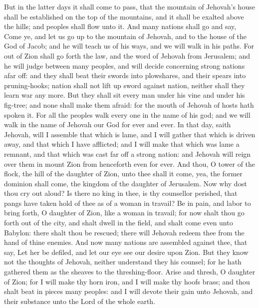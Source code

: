 But in the latter days it shall come to pass, that the mountain of Jehovah’s house shall be established on the top of the mountains, and it shall be exalted above the hills; and peoples shall flow unto it. And many nations shall go and say, Come ye, and let us go up to the mountain of Jehovah, and to the house of the God of Jacob; and he will teach us of his ways, and we will walk in his paths. For out of Zion shall go forth the law, and the word of Jehovah from Jerusalem; and he will judge between many peoples, and will decide concerning strong nations afar off: and they shall beat their swords into plowshares, and their spears into pruning-hooks; nation shall not lift up sword against nation, neither shall they learn war any more. But they shall sit every man under his vine and under his fig-tree; and none shall make them afraid: for the mouth of Jehovah of hosts hath spoken it. For all the peoples walk every one in the name of his god; and we will walk in the name of Jehovah our God for ever and ever.  In that day, saith Jehovah, will I assemble that which is lame, and I will gather that which is driven away, and that which I have afflicted; and I will make that which was lame a remnant, and that which was cast far off a strong nation: and Jehovah will reign over them in mount Zion from henceforth even for ever. And thou, O tower of the flock, the hill of the daughter of Zion, unto thee shall it come, yea, the former dominion shall come, the kingdom of the daughter of Jerusalem.  Now why dost thou cry out aloud? Is there no king in thee, is thy counsellor perished, that pangs have taken hold of thee as of a woman in travail? Be in pain, and labor to bring forth, O daughter of Zion, like a woman in travail; for now shalt thou go forth out of the city, and shalt dwell in the field, and shalt come even unto Babylon: there shalt thou be rescued; there will Jehovah redeem thee from the hand of thine enemies. And now many nations are assembled against thee, that say, Let her be defiled, and let our eye see our desire upon Zion. But they know not the thoughts of Jehovah, neither understand they his counsel; for he hath gathered them as the sheaves to the threshing-floor. Arise and thresh, O daughter of Zion; for I will make thy horn iron, and I will make thy hoofs brass; and thou shalt beat in pieces many peoples: and I will devote their gain unto Jehovah, and their substance unto the Lord of the whole earth. 

